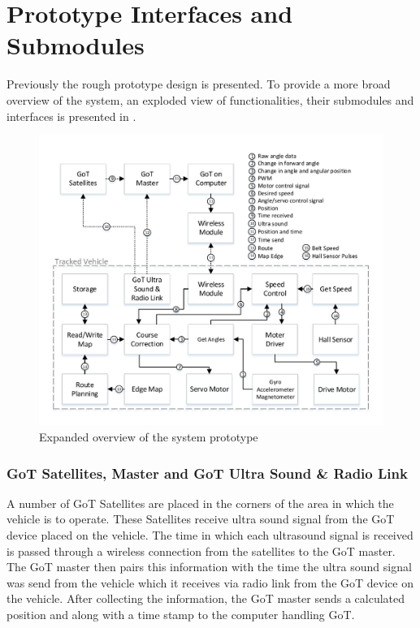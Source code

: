 \section{Prototype Interfaces and Submodules}
Previously the rough prototype design is presented. To provide a more broad overview of the system, an exploded view of functionalities, their submodules and interfaces is presented in .

\begin{figure}[H]
	\centering
	\includegraphics[scale=.9]{figures/systemOverview2}
	\caption{Expanded overview of the system prototype}
	\label{fig:systemOverview2}
\end{figure}

\subsubsection{GoT Satellites, Master and GoT Ultra Sound \& Radio Link}
A number of GoT Satellites are placed in the corners of the area in which the vehicle is to operate. These Satellites receive ultra sound signal from the GoT device placed on the vehicle. The time in which each ultrasound signal is received is passed through a wireless connection from the satellites to the GoT master. The GoT master then pairs this information with the time the ultra sound signal was send from the vehicle which it receives via radio link from the GoT device on the vehicle. After collecting the information, the GoT master sends a calculated position and along with a time stamp to the computer handling GoT.

